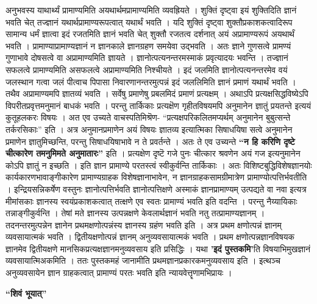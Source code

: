 अनुभवस्य याथार्थ्यं प्रामाण्यमिति अयथार्थमप्रामाण्यमिति व्यवह्रियते । शुक्तिं दृष्ट्वा इयं शुक्तिदिति ज्ञानं भवति चेत् तज्ज्ञानं यथार्थप्रामाण्यरूपत्वात् यथार्थं भवति । यदि शुक्तिं दृष्ट्वा शुक्तौप्रकाशकत्वादिरूप सामान्य धर्मं ज्ञात्वा इदं रजतमिति ज्ञानं भवति चेत् शुक्तौ रजतत्व दर्शनात् अयं अप्रामाण्यरूपं अयथार्थं भवति । प्रामाण्याप्रामाण्यज्ञानं न ज्ञानकाले ज्ञानग्रहण समयेवा उद्भवति । अतः ज्ञाने गुणसत्वे प्रामण्यं गुणाभावे दोषसत्वे वा अप्रामाण्यमिति ज्ञायते । ज्ञानोत्पत्यनन्तरमस्माकं प्रवृत्यादयः भवन्ति । तज्ज्ञानं सफलत्वे प्रामाण्यमिति असफलत्वे अप्रामाण्यमिति निश्चीयते । इदं जलमिति ज्ञानोत्पत्यनन्तरमेव वयं जलस्थान गत्वा जलं पीत्वाच पिपासा निवारणानन्तरमुत्पन्नं इदं जललिमिति ज्ञानं प्रमाणं यथार्थं भवति । तथैव अप्रामाण्यमपि ज्ञातव्यं भवति । सर्वेषु प्रमाणेषु प्रबलमिदं प्रमाणं प्रत्यक्षम् । अथाऽपि प्रत्यक्षसिद्धविष्येऽपि विपरीतप्रवृत्तमनुमानं बाधकं भवति । परन्तु तार्किकाः प्रत्यक्षॆण गृहीतविषयमपि अनुमानेन ज्ञातुं प्रयतन्ते इत्ययं कुतूहलकरः विषयः । अत एव उच्यते वाचस्पतिमिश्रॆण- “प्रत्यक्षपरिकलितमप्यर्थम् अनुमानेन बुबुत्सन्ते तर्करसिकाः” इति । अत्र अनुमानप्रमाणेन अयं विषयः ज्ञातव्य इत्यात्मिका सिषाधयिषा सत्वे अनुमानेन प्रमाणेन ज्ञातुमिच्छन्ति, परन्तु सिषाधयिषाभावे न ते प्रवर्तन्ते । अतः ते एव उच्यन्ते \textbf{“न हि करिणि दृष्टे चीत्कारेण तमनुमिमते अनुमातारः”} इति । प्रत्यक्षेण दृष्टॆ गजे पुनः चीत्कार श्रवणेन अयं गज इत्यनुमानेन कोऽपि ज्ञातुं न इच्छति । इति ज्ञान प्रामाण्ये परतस्त्वं स्वीकुर्वन्ति तार्किकाः । अतः विशिष्टबुद्धिविशेषज्ञानयोः कार्यकारणभावाङ्गीकारेण प्रामाण्यग्राहक विशेषज्ञानाभावेन, न ज्ञानग्राहकसामग्रीमात्रेण प्रामाण्योत्पत्तिर्भवतीति । इन्द्रियसन्निकर्षेण वस्तुनः ज्ञानोत्पत्तिर्भवति ज्ञानोत्पत्तिक्षणे अस्माकं ज्ञानप्रामाण्यम् उत्पद्यते वा नवा इत्यत्र मीमांसकाः ज्ञानस्य स्वयंप्रकाशकत्वात् तत्क्षणे एव स्वतः प्रामाण्यं भवति इति वदन्ति । परन्तु नैय्यायिकाः तन्नाङ्गीकुर्वन्ति । तेषां मते ज्ञानस्य उत्पन्नक्षणे केवलार्थज्ञानं भवति नतु तत्प्रामाण्यज्ञानम् । तदनन्तरमुत्पन्नेन ज्ञानेन प्रथमक्षणोत्पन्नंस्य ज्ञानस्य ग्रहंण भवति इति । अत्र प्रथम क्षणोत्पन्नं ज्ञानम् व्यवसायात्मकं भवति । द्वितीयक्षणोत्पन्नं ज्ञानम् अनुव्यवसायात्मकं भवति । प्रथम क्षणोत्पन्नज्ञानविषयक ज्ञानमेव द्वितीयक्षणे मानसिकप्रत्यक्षज्ञानमनुव्यवसाय इति प्रसिद्धिः । यथा \textbf{’इदं पुस्तकमि’}ति विषयाभिमुखज्ञानं व्यवसायात्मिअकमिति । ततः पुस्तकमहं जानामीति प्रथमज्ञानप्रकारकमनुव्यवसाय इति । इत्थञ्च अनुव्यवसायेन ज्ञान ग्राहकत्वात् प्रामाण्यं परतः भवति इति न्यायवेत्तॄणामभिप्रायः ।

\textbf{“शिवं भूयात्”}

